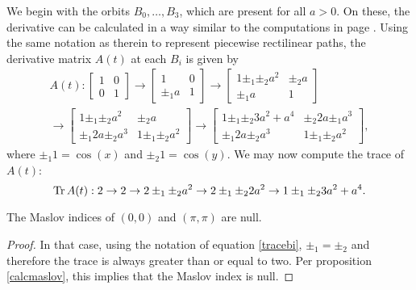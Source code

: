 We begin with the orbits $B_0, \dots, B_3$, which are present for all $a > 0$. On these, the derivative can be calculated in a way similar to the computations in page \pageref{rectpath1}. Using the same notation as therein to represent piecewise rectilinear paths, the derivative matrix $A(t)$ at each $B_i$ is given by
\begin{equation}
\begin{multlined}
A(t):
\begin{bmatrix}
1 & 0\\
0 & 1
\end{bmatrix}
\to
\begin{bmatrix}
1 & 0\\
\pm_1 a & 1
\end{bmatrix}
\to
\begin{bmatrix}
1 \pm_1 \pm_2 a^2 &  \pm_2 a\\
\pm_1 a & 1
\end{bmatrix}\\
\to
\begin{bmatrix}
1 \pm_1 \pm_2 a^2 &  \pm_2 a\\
\pm_1 2a \pm_2 a^3 & 1 \pm_1 \pm_2 a^2
\end{bmatrix}
\to
\begin{bmatrix}
1 \pm_1 \pm_2 3 a^2 + a^4 &  \pm_2 2 a \pm_1 a^3\\
\pm_1 2a \pm_2 a^3 & 1 \pm_1 \pm_2 a^2
\end{bmatrix},
\end{multlined}
\end{equation}
where $\pm_1 1 = \cos(x)$ and $\pm_2 1 = \cos(y)$. We may now compute the trace of $A(t)$:
\begin{equation}\label{tracebi}
\operatorname{Tr} A(t): 2 \to 2 \to 2 \pm_1 \pm_2 a^2 \to 2 \pm_1 \pm_2 2 a^2 \to 1 \pm_1 \pm_2 3 a^2 + a^4.
\end{equation}

\begin{prop}
The Maslov indices of $(0,0)$ and $(\pi,\pi)$ are null.
\end{prop}

\begin{proof}
In that case, using the notation of equation \eqref{tracebi}, $\pm_1 = \pm_2$ and therefore the trace is always greater than or equal to two. Per proposition \ref{calcmaslov}, this implies that the Maslov index is null.
\end{proof}